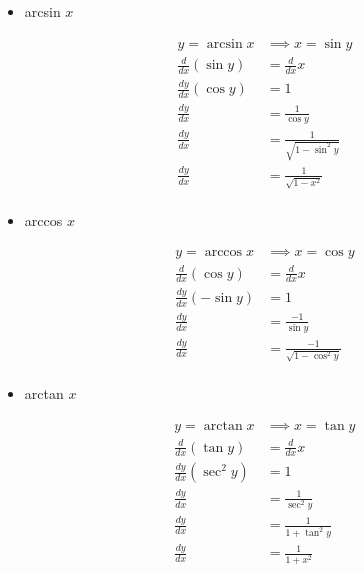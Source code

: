 \documentclass[12pt]{article}
\begin{document}
        \begin{itemize}
            
            \item arcsin $x$ 
            
                \[
                    \begin{aligned}
                        y = \arcsin x &\implies x = \sin y \\  
                        \frac{d}{dx}(\sin y) &= \frac{d}{dx} x \\
                        \frac{dy}{dx} (\cos y) &= 1 \\
                        \frac{dy}{dx} &= \frac{1}{\cos y} \\
                        \frac{dy}{dx} &= \frac{1}{\sqrt{1 - \sin^2 y}} \\
                        \frac{dy}{dx} &= \frac{1}{\sqrt{1 - x^2}} \\
                    \end{aligned}  
                \]

            \item arccos $x$

                \[
                    \begin{aligned}
                        y = \arccos x &\implies x = \cos y \\  
                        \frac{d}{dx}(\cos y) &= \frac{d}{dx} x \\
                        \frac{dy}{dx} (-\sin y) &= 1 \\
                        \frac{dy}{dx} &= \frac{-1}{\sin y} \\
                        \frac{dy}{dx} &= \frac{-1}{\sqrt{1 - \cos^2 y}} \\
                    \end{aligned}  
                \]

            \item arctan $x$ 
            
                \[
                    \begin{aligned}
                        y = \arctan x &\implies x = \tan y \\  
                        \frac{d}{dx}(\tan y) &= \frac{d}{dx} x \\
                        \frac{dy}{dx} (\sec^2 y) &= 1 \\
                        \frac{dy}{dx} &= \frac{1}{\sec^2 y} \\
                        \frac{dy}{dx} &= \frac{1}{1 + \tan^2 y} \\
                        \frac{dy}{dx} &= \frac{1}{1 + x^2} \\
                    \end{aligned}  
                \]

        \end{itemize}
\end{document}
